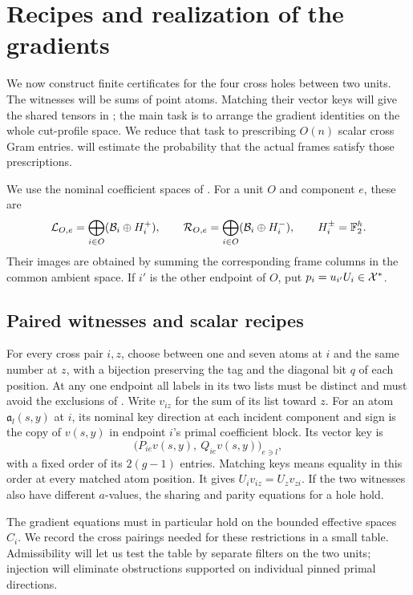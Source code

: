 \section{Recipes and realization of the gradients}\label{sec:realization}

We now construct finite certificates for the four cross holes between
two units.  The witnesses will be sums of point atoms.  Matching their
vector keys will give the shared tensors in ;
the main task is to arrange the gradient identities on the whole
cut-profile space.  We reduce that task to prescribing $O(n)$ scalar
cross Gram entries.   will estimate the probability
that the actual frames satisfy those prescriptions.

We use the nominal coefficient spaces of .
For a unit $O$ and component $e$, these are
\[
 \mathcal L_{O,e}=\bigoplus_{i\in O}(\mathcal B_i\oplus H_i^+),\qquad
 \mathcal R_{O,e}=\bigoplus_{i\in O}(\mathcal B_i\oplus H_i^-),
 \qquad H_i^\pm=\mathbb F_2^h.
\]
Their images are obtained by summing the corresponding frame
columns in the common ambient space.  If $i'$ is the other
endpoint of $O$, put $p_i=u_{i'}U_i\in\mathcal X^*$.

\subsection{Paired witnesses and scalar recipes}

For every cross pair $i,z$, choose between one and seven atoms
at $i$ and the same number at $z$, with a bijection preserving
the tag and the diagonal bit $q$ of each position.  At any
one endpoint all labels in its two lists must be distinct and
must avoid the exclusions of .
Write $v_{iz}$ for the sum of its list toward $z$.
For an atom $\mathfrak a_l(s,y)$ at $i$, its nominal key direction
at each incident component and sign is the copy of $v(s,y)$ in
endpoint $i$'s primal coefficient block.  Its vector key is
\[
 \bigl(P_{ie}v(s,y),\ Q_{ie}v(s,y)\bigr)_{e\ni l},
\]
with a fixed order of its $2(g-1)$ entries.  Matching keys means
equality in this order at every matched atom position.  It gives
$U_iv_{iz}=U_zv_{zi}$.  If the two witnesses also have different
$a$-values, the sharing and parity equations for a hole hold.

The gradient equations must in particular hold on the bounded
effective spaces $C_i$.  We record the cross pairings needed for
these restrictions in a small table.  Admissibility will let us
test the table by separate filters on the two units; injection
will eliminate obstructions supported on individual pinned
primal directions.


